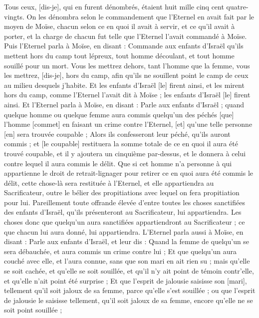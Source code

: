 \begin{multicols}{2}
Tous ceux, [dis-je], qui en furent dénombrés, étaient huit mille cinq cent quatre-vingts.
On les dénombra selon le commandement que l'Eternel en avait fait par le moyen de Moïse, chacun selon ce en quoi il avait à servir, et ce qu'il avait à porter, et la charge de chacun fut telle que l'Eternel l'avait commandé à Moïse.
\VerseOne{}Puis l'Eternel parla à Moïse, en disant :
Commande aux enfants d'Israël qu'ils mettent hors du camp tout lépreux, tout homme découlant, et tout homme souillé pour un mort.
Vous les mettrez dehors, tant l'homme que la femme, vous les mettrez, [dis-je], hors du camp, afin qu'ils ne souillent point le camp de ceux au milieu desquels j'habite.
Et les enfants d'Israël [le] firent ainsi, et les mirent hors du camp, comme l'Eternel l'avait dit à Moïse ; les enfants d'Israël [le] firent ainsi.
Et l'Eternel parla à Moïse, en disant :
Parle aux enfants d'Israël ; quand quelque homme ou quelque femme aura commis quelqu'un des péchés [que] l'homme [commet] en faisant un crime contre l'Eternel, [et] qu'une telle personne [en] sera trouvée coupable ;
Alors ils confesseront leur péché, qu'ils auront commis ; et [le coupable] restituera la somme totale de ce en quoi il aura été trouvé coupable, et il y ajoutera un cinquième par-dessus, et le donnera à celui contre lequel il aura commis le délit.
Que si cet homme n'a personne à qui appartienne le droit de retrait-lignager pour retirer ce en quoi aura été commis le délit, cette chose-là sera restituée à l'Eternel, et elle appartiendra au Sacrificateur, outre le bélier des propitiations avec lequel on fera propitiation pour lui.
Pareillement toute offrande élevée d'entre toutes les choses sanctifiées des enfants d'Israël, qu'ils présenteront au Sacrificateur, lui appartiendra.
Les choses donc que quelqu'un aura sanctifiées appartiendront au Sacrificateur ; ce que chacun lui aura donné, lui appartiendra.
L'Eternel parla aussi à Moïse, en disant :
Parle aux enfants d'Israël, et leur dis : Quand la femme de quelqu'un se sera débauchée, et aura commis un crime contre lui ;
Et que quelqu'un aura couché avec elle, et l'aura connue, sans que son mari en ait rien su ; mais qu'elle se soit cachée, et qu'elle se soit souillée, et qu'il n'y ait point de témoin contr'elle, et qu'elle n'ait point été surprise ;
Et que l'esprit de jalousie saisisse son [mari], tellement qu'il soit jaloux de sa femme, parce qu'elle s'est souillée ; ou que l'esprit de jalousie le saisisse tellement, qu'il soit jaloux de sa femme, encore qu'elle ne se soit point souillée ;

\end{multicols}
